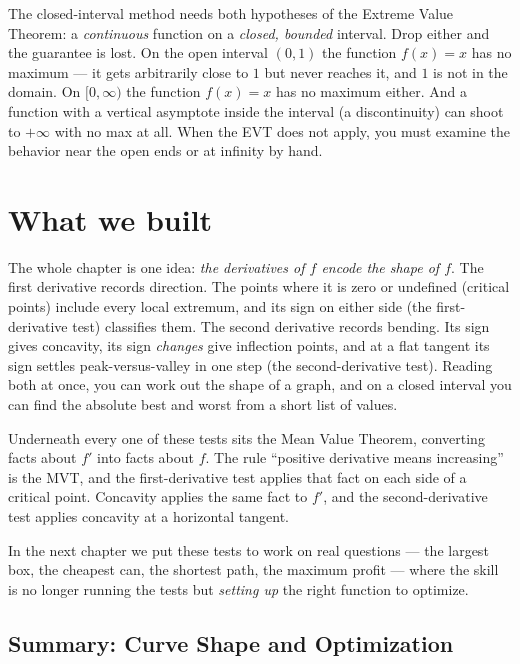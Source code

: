 \begin{trapbox}
The closed-interval method needs both hypotheses of the Extreme Value Theorem:
a \emph{continuous} function on a \emph{closed, bounded} interval. Drop either and
the guarantee is lost. On the open interval $(0,1)$ the function $f(x)=x$ has no
maximum --- it gets arbitrarily close to $1$ but never reaches it, and $1$ is not in
the domain. On $[0,\infty)$ the function $f(x)=x$ has no maximum either. And a
function with a vertical asymptote inside the interval (a discontinuity) can shoot
to $+\infty$ with no max at all. When the EVT does not apply, you must examine the
behavior near the open ends or at infinity by hand.
\end{trapbox}

\section{What we built}

The whole chapter is one idea: \emph{the derivatives of $f$ encode the
shape of $f$}. The first derivative records direction. The points where it is zero
or undefined (critical points) include every local extremum, and its sign on
either side (the first-derivative test) classifies them. The second derivative
records bending. Its sign gives concavity, its sign \emph{changes} give
inflection points, and at a flat tangent its sign settles peak-versus-valley in
one step (the second-derivative test). Reading both at once, you can work out the
shape of a graph, and on a closed interval you can find the absolute best and
worst from a short list of values.

Underneath every one of these tests sits the Mean Value Theorem,
converting facts about $f'$ into facts about $f$. The rule ``positive derivative means
increasing'' is the MVT, and the first-derivative test applies that fact on each
side of a critical point. Concavity applies the same fact to $f'$, and the
second-derivative test applies concavity at a horizontal tangent.

In the next chapter we put these tests to work on real questions --- the largest
box, the cheapest can, the shortest path, the maximum profit --- where the skill is
no longer running the tests but \emph{setting up} the right function to optimize.

\subsection*{Summary: Curve Shape and Optimization}

